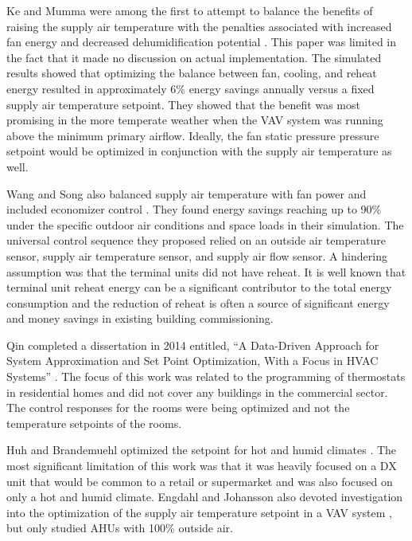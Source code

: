 Ke and Mumma were among the first to attempt to balance the benefits of
raising the supply air temperature with the penalties associated with
increased fan energy and decreased dehumidification potential
\cite{Ke1997OptimizedSystems}. This paper was limited in the fact that
it made no discussion on actual implementation. The simulated results
showed that optimizing the balance between fan, cooling, and reheat
energy resulted in approximately 6\% energy savings annually versus a
fixed supply air temperature setpoint. They showed that the benefit was
most promising in the more temperate weather when the VAV system was
running above the minimum primary airflow. Ideally, the fan static
pressure pressure setpoint would be optimized in conjunction with the
supply air temperature as well. 

Wang and Song also balanced supply air temperature with fan power and
included economizer control \cite{Wang2012AirCycles}. They found energy
savings reaching up to 90\% under the specific outdoor air conditions
and space loads in their simulation. The universal control sequence they
proposed relied on an outside air temperature sensor, supply air
temperature sensor, and supply air flow sensor. A hindering assumption
was that the terminal units did not have reheat. It is well known that
terminal unit reheat energy can be a significant contributor to the
total energy consumption and the reduction of reheat is often a source
of significant energy and money savings in existing building
commissioning.  

Qin completed a dissertation in 2014 entitled, ``A Data-Driven Approach
for System Approximation and Set Point Optimization, With a Focus in
HVAC Systems'' \cite{Qin_2014_Res_Letters}. The focus of this work was
related to the programming of thermostats in residential homes and did
not cover any buildings in the commercial sector. The control responses
for the rooms were being optimized and not the temperature setpoints of
the rooms.  

Huh and Brandemuehl optimized the setpoint for hot and humid climates
\cite{Huh2008}. The most significant limitation of this work was that it
was heavily focused on a DX unit that would be common to a retail or
supermarket and was also focused on only a hot and humid climate.
Engdahl and Johansson also devoted investigation into the optimization
of the supply air temperature setpoint in a VAV system
\cite{Engdahl2004}, but only studied AHUs with 100\% outside air. 

